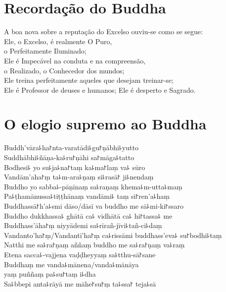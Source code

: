 \chapter{Recordação do Buddha}

\begin{leader}
\end{leader}

A boa nova sobre a reputação do Excelso ouviu-se como se segue:\\
Ele, o Excelso, é realmente O Puro,\\
\vin o Perfeitamente Iluminado;\\
Ele é Impecável na conduta e na compreensão,\\
\vin o Realizado, o Conhecedor dos mundos;\\
Ele treina perfeitamente aqueles que desejam treinar-se;\\
\vin Ele é Professor de deuses e humanos; Ele é desperto e Sagrado.

\clearpage

\chapter*{O elogio supremo ao Buddha}

\delegateSetUseNext

\begin{leader}
\end{leader}

Buddh'vāra꜕ha꜓nta-varatādi꜕gu꜓ṇābhi꜕yutto\\
Suddhābhi꜕ñāṇa-ka꜕ru꜓ṇāhi sa꜓māga꜕tatto\\
Bodhesi꜕ yo su꜕ja꜕na꜓taṃ ka꜕ma꜓laṃ va꜕ sūro\\
Vandām'aha꜓ṃ ta꜕m-ara꜕ṇaṃ si꜕rasā꜓ ji꜕nendaṃ\\
Buddho yo sabba꜕-pāṇīnaṃ sa꜕raṇaṃ khema꜕m-utta꜕maṃ\\
Pa꜕ṭhamānussa꜕tiṭṭhānaṃ vandāmi꜕ taṃ si꜓ren'a꜕haṃ\\
Buddhassā꜓h'a꜕smi dāso/dāsī va buddho me sā꜕mi-ki꜓ssaro\\
Buddho dukkhassa꜕ ghātā ca꜕ vidhātā ca꜕ hi꜓tassa꜕ me\\
Buddhass'āha꜓ṃ niyyādemi sa꜕rīrañ-jīvi꜕tañ-ci꜕daṃ\\
Vandanto'ha꜓ṃ/Vandantī'ha꜓ṃ ca꜕rissāmi buddhass'eva꜕ su꜓bodhi꜕taṃ\\
Natthi me sa꜕ra꜓ṇaṃ aññaṃ buddho me sa꜕ra꜓ṇaṃ va꜕raṃ\\
Etena sacca꜕-vajjena vaḍḍheyyaṃ sa꜕tthu-sā꜓sane\\
Buddhaṃ me vanda꜕mānena/vanda꜕mānāya\\
\vin yaṃ puññaṃ pa꜕su꜓taṃ i꜕dha\\
Sa꜕bbepi anta꜕rāyā me māhe꜓su꜓ṃ ta꜕ssa꜓ teja꜕sā

